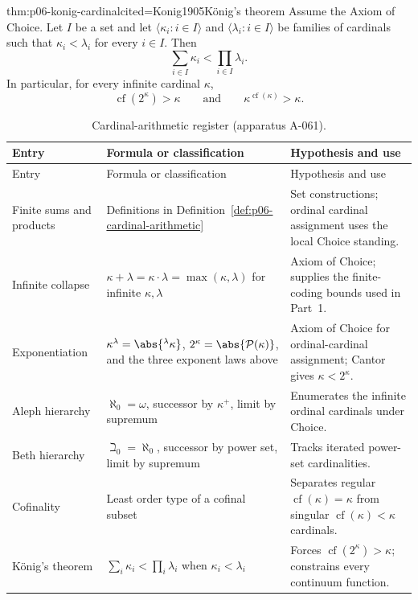 \begin{hbtheorem}{thm:p06-konig-cardinal}{cited=Konig1905}{K\"onig's theorem}
Assume the Axiom of Choice.  Let \(I\) be a set and let
\(\langle\kappa_i:i\in I\rangle\) and
\(\langle\lambda_i:i\in I\rangle\) be families of cardinals such that
\(\kappa_i<\lambda_i\) for every \(i\in I\).  Then
\[
  \sum_{i\in I}\kappa_i
  <
  \prod_{i\in I}\lambda_i.
\]
In particular, for every infinite cardinal \(\kappa\),
\[
  \operatorname{cf}(2^\kappa)>\kappa
  \qquad\text{and}\qquad
  \kappa^{\operatorname{cf}(\kappa)}>\kappa.
\]
\end{hbtheorem}

\begingroup\small
\begin{longtable}{@{}p{}p{}p{}@{}}
\caption{Cardinal-arithmetic register (apparatus A-061).}
\label{tab:p06-cardinal-arithmetic}\\
\toprule
Entry & Formula or classification & Hypothesis and use \\
\midrule
\endfirsthead
\toprule
Entry & Formula or classification & Hypothesis and use \\
\midrule
\endhead
Finite sums and products & Definitions in
Definition~\ref{def:p06-cardinal-arithmetic} & Set constructions; ordinal
cardinal assignment uses the local Choice standing. \\
Infinite collapse & \(\kappa+\lambda=\kappa\cdot\lambda=
\max(\kappa,\lambda)\) for infinite \(\kappa,\lambda\) & Axiom of Choice;
supplies the finite-coding bounds used in Part~1. \\
Exponentiation & \(\kappa^\lambda=\abs{{}^{\lambda}\kappa}\),
\(2^\kappa=\abs{\mathcal P(\kappa)}\), and the three exponent laws above & Axiom
of Choice for ordinal-cardinal assignment; Cantor gives
\(\kappa<2^\kappa\). \\
Aleph hierarchy & \(\aleph_0=\omega\), successor by \(\kappa^+\), limit by
supremum & Enumerates the infinite ordinal cardinals under Choice. \\
Beth hierarchy & \(\beth_0=\aleph_0\), successor by power set, limit by
supremum & Tracks iterated power-set cardinalities. \\
Cofinality & Least order type of a cofinal subset & Separates regular
\(\operatorname{cf}(\kappa)=\kappa\) from singular
\(\operatorname{cf}(\kappa)<\kappa\) cardinals. \\
K\"onig's theorem & \(\sum_i\kappa_i<\prod_i\lambda_i\) when
\(\kappa_i<\lambda_i\) & Forces
\(\operatorname{cf}(2^\kappa)>\kappa\); constrains every continuum function. \\

\end{longtable}
